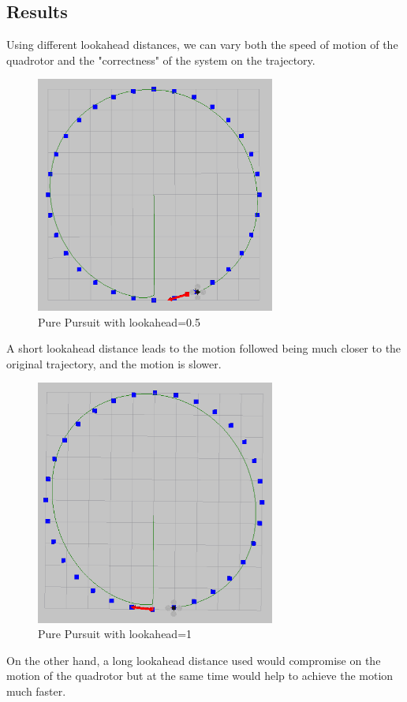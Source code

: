 \documentclass[hidelinks,BTech]{iitmdiss}
\begin{document}
\subsection*{Results}
Using different lookahead distances, we can vary both the speed of motion of the quadrotor and the "correctness" of the system on the trajectory.
\begin{figure}[H]
  \centering
    \includegraphics[width=0.7\textwidth]{Pure_Pursuit_0_5.png}
    \caption{Pure Pursuit with lookahead=0.5}
\end{figure}
A short lookahead distance leads to the motion followed being much closer to the original trajectory, and the motion is slower.

\begin{figure}[H]
  \centering
    \includegraphics[width=0.7\textwidth]{Pure_Pursuit_1.png}
    \caption{Pure Pursuit with lookahead=1}
\end{figure}
On the other hand, a long lookahead distance used would compromise on the motion of the quadrotor but at the same time would help to achieve the motion much faster.
\end{document}
